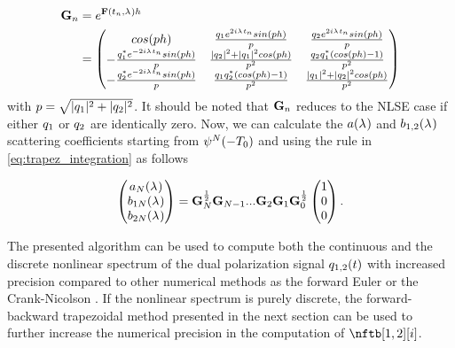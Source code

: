 \begin{align}
    \matr{G}_n&=e^{\matr{F}(t_n,\eig)h}\\
    &= \begin{pmatrix}
      cos(ph)& \frac{\nfld[1]e^{2i\eig  t_n}sin(ph)}{p} & \frac{\nfld[2]e^{2i\eig  t_n}sin(ph)}{p} \\
        -\frac{\nfld[1]^*e^{-2i\eig  t_n}sin(ph)}{p}  & \frac{|\nfld[2]|^2+|\nfld[1]|^2cos(ph)}{p^2} &\frac{\nfld[2]\nfld[1]^*(cos(ph)-1)}{p^2} \\
      -\frac{\nfld[2]^*e^{-2i\eig  t_n}sin(ph)}{p}  & \frac{\nfld[1]\nfld[2]^*(cos(ph)-1)}{p^2} & \frac{|\nfld[1]|^2+|\nfld[2]|^2cos(ph)}{p^2}
     \end{pmatrix}\nonumber
\end{align}
with $p=\sqrt{|\nfld[1]|^2+|\nfld[2]|^2}$. It should be noted that $\matr{G}_n$ reduces to the \ac{NLSE} case \cite{Aref2016c} if either $\nfld[1]$ or $\nfld[2]$ are identically zero.
Now, we can calculate  the $a(\eig)$ and $b_{1,2}(\eig)$ scattering coefficients starting from $\tjostnshrt(-T_0)$ and using the rule in
\eqref{eq:trapez_integration} as follows

\begin{align}
\begin{pmatrix}
       a_N(\eig)  \\
       b_{1N} (\eig)\\
       b_{2N}(\eig)
     \end{pmatrix}=\matr{G}_N^{\frac{1}{2}}\matr{G}_{N-1}...\matr{G}_2\matr{G}_1\matr{G}_0^{\frac{1}{2}}\begin{pmatrix}
       1  \\
       0\\
       0
     \end{pmatrix}.
\end{align}

The presented algorithm can be used to compute both the continuous and the discrete nonlinear spectrum of the dual polarization signal $\nflds[1,2]$ with increased precision compared to other numerical methods as the forward Euler or the Crank-Nicolson \cite{Aref2016c}. If the nonlinear spectrum is purely discrete, the forward-backward trapezoidal method presented in the  next section can be used to further increase the numerical precision in the computation of $\nftb[1,2][i]$.


